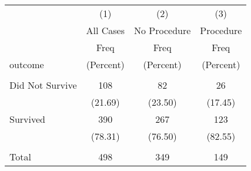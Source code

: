 \begin{tabular}{lccc} \hline
 & (1) & (2) & (3) \\
 & All Cases & No Procedure & Procedure \\
 & Freq & Freq & Freq \\
outcome & (Percent) & (Percent) & (Percent) \\ \hline
 &  &  &  \\
Did Not Survive & 108 & 82 & 26 \\
 & (21.69) & (23.50) & (17.45) \\
Survived & 390 & 267 & 123 \\
 & (78.31) & (76.50) & (82.55) \\
 &  &  &  \\
 Total & 498 & 349 & 149 \\ \hline
\end{tabular}
